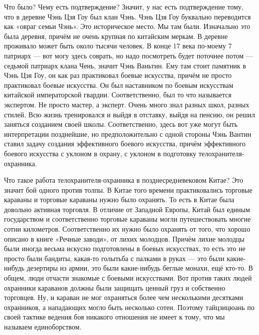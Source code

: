 Что было? Чему есть подтверждение? Значит, у нас есть подтверждение тому, что в деревне 
Чэнь Цзя Гоу был клан Чэнь. Чэнь Цзя Гоу буквально переводится как «овраг семьи Чэнь». Это 
историческое место. Мы там были. Изначально это была деревня, причём не очень крупная по 
китайским меркам. В деревне проживало может быть около тысячи человек. В 
конце 17 века по-моему 7 патриарх --- вот могу здесь соврать, но надо посмотреть будет поточнее 
потом --- седьмой патриарх клана Чень, значит Чэнь Ваньтин. Ему там стоит памятник в Чэнь
Цзя Гоу, он как раз практиковал боевые искусства, причём не просто практиковал боевые искусства.
Он был наставником по боевым искусствам китайской императорской гвардии. Соответственно, был то
что называется экспертом. Не просто мастер, а эксперт. Очень много знал разных школ, разных стилей.
Всю жизнь тренировался и выйдя в отставку, выйдя на пенсию, он решил заняться созданием своей
школы. Соответственно, здесь вот уже могут быть интерпретации позднейшие, но 
предположительно с одной стороны Чэнь Вантин ставил задачу создания эффективного боевого 
искусства, причём эффективного боевого искусства с уклоном в охрану, с уклоном в подготовку 
телохранителя-охранника.

Что такое работа телохранителя-охранника в позднесредневековом 
Китае? Это значит бой одного против толпы. В Китае того времени практиковались торговые 
караваны и торговые караваны нужно было охранять. То есть в Китае была довольно активная 
торговля. В отличие от Западной Европы, Китай был единым государством и соответственно 
торговые караваны могли путешествовать многие сотни километров. Соответственно их нужно 
было охранять от того, что хорошо описано в книге «Речные заводи», от лихих молодцов.
Причём лихие молодцы были иногда весьма искусно подготовлены в боевых искусствах, то есть
это не просто были бандиты, какая-то голытьба с палками в руках --- это были какие-нибудь
дезертиры из армии, это были какие-нибудь беглые монахи, ещё кто-то. В общем,
люди отчасти знакомые с 
боевыми искусствами. Вот против таких людей охранники караванов должны были защищать ценный 
груз и собственно торговцев. Ну, и караван не мог охраняться более чем несколькими десятками 
охранников, а нападающих могло быть несколько сотен. Поэтому тайцзицюань по своей тактике 
ведения боя никакого отношения не имеет к тому, что мы называем единоборством.

